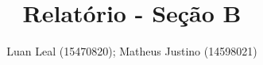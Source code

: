 \documentclass{article}
\author{Luan Leal (15470820); Matheus Justino (14598021) }
\title{Relatório - Seção B}
\begin{document}
\maketitle


    \begin{multicols}{2}

    
    
    
    
    

    

    \end{multicols}
    
\end{document}
